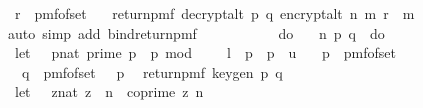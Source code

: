 \begin{isabellebody}
\ \ r\ {\isasymleftarrow}\ pmf{\isacharunderscore}{\kern0pt}of{\isacharunderscore}{\kern0pt}set\ {\isasymZ}{\isacharsemicolon}{\kern0pt}\isanewline
\ \ return{\isacharunderscore}{\kern0pt}pmf\ {\isacharparenleft}{\kern0pt}decrypt{\isacharunderscore}{\kern0pt}alt\ p\ q\ {\isacharparenleft}{\kern0pt}encrypt{\isacharunderscore}{\kern0pt}alt\ n\ m\ r{\isacharparenright}{\kern0pt}\ {\isacharequal}{\kern0pt}\ m{\isacharparenright}{\kern0pt}{\isacharbraceright}{\kern0pt}{\isachardoublequoteclose}\ \isanewline
\ \ \ \ \isamarkupfalse%
\ {\isacharparenleft}{\kern0pt}auto\ simp\ add{\isacharcolon}{\kern0pt}\ bind{\isacharunderscore}{\kern0pt}return{\isacharunderscore}{\kern0pt}pmf{\isacharparenright}{\kern0pt}\isanewline
\isanewline
\ \ \isamarkupfalse%
\ \isamarkupfalse%
\ {\isachardoublequoteopen}{\isachardot}{\kern0pt}{\isachardot}{\kern0pt}{\isachardot}{\kern0pt}\ {\isacharequal}{\kern0pt}\ \isanewline
\ \ \ do\ {\isacharbraceleft}{\kern0pt}\isanewline
\ \ {\isacharparenleft}{\kern0pt}n{\isacharcomma}{\kern0pt}\ {\isacharparenleft}{\kern0pt}p{\isacharcomma}{\kern0pt}\ q{\isacharparenright}{\kern0pt}{\isacharparenright}{\kern0pt}\ {\isasymleftarrow}\ do\ {\isacharbraceleft}{\kern0pt}\isanewline
\ \ let\ {\isasymK}\ {\isacharequal}{\kern0pt}\ {\isacharbraceleft}{\kern0pt}{\isacharparenleft}{\kern0pt}p{\isacharcolon}{\kern0pt}{\isacharcolon}{\kern0pt}nat{\isacharparenright}{\kern0pt}{\isachardot}{\kern0pt}\ prime\ p\ {\isasymand}\ p\ mod\ {}\ {\isacharequal}{\kern0pt}\ {}\ {\isasymand}\ l\ {\isasymle}\ p\ {\isasymand}\ p\ {\isasymle}\ u{\isacharbraceright}{\kern0pt}{\isacharsemicolon}{\kern0pt}\isanewline
\ \ \ p\ {\isasymleftarrow}\ pmf{\isacharunderscore}{\kern0pt}of{\isacharunderscore}{\kern0pt}set\ {\isasymK}{\isacharsemicolon}{\kern0pt}\ \isanewline
\ \ \ q\ {\isasymleftarrow}\ pmf{\isacharunderscore}{\kern0pt}of{\isacharunderscore}{\kern0pt}set\ {\isacharparenleft}{\kern0pt}{\isasymK}\ {\isacharminus}{\kern0pt}\ {\isacharbraceleft}{\kern0pt}p{\isacharbraceright}{\kern0pt}{\isacharparenright}{\kern0pt}{\isacharsemicolon}{\kern0pt}\isanewline
\ \ return{\isacharunderscore}{\kern0pt}pmf\ {\isacharparenleft}{\kern0pt}key{\isacharunderscore}{\kern0pt}gen\ p\ q{\isacharparenright}{\kern0pt}\isanewline
\ \ {\isacharbraceright}{\kern0pt}{\isacharsemicolon}{\kern0pt}\isanewline
\ \ let\ {\isasymZ}\ {\isacharequal}{\kern0pt}\ {\isacharbraceleft}{\kern0pt}{\isacharparenleft}{\kern0pt}z{\isacharcolon}{\kern0pt}{\isacharcolon}{\kern0pt}nat{\isacharparenright}{\kern0pt}{\isachardot}{\kern0pt}\ z\ {\isacharless}{\kern0pt}\ n\ {\isasymand}\ coprime\ z\ n{\isacharbraceright}{\kern0pt}{\isacharsemicolon}{\kern0pt}\isanewline

\end{isabellebody}
